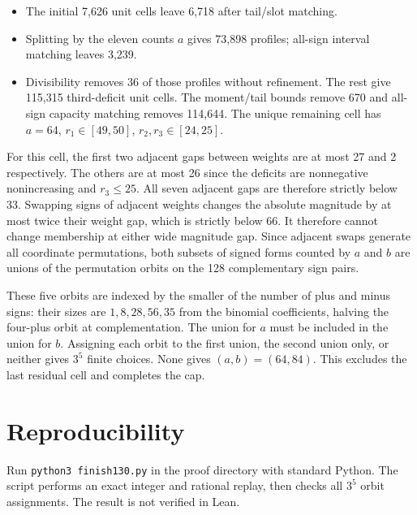 \documentclass[11pt,letterpaper]{article}
\providecommand{\tightlist}{\setlength{\itemsep}{0pt}\setlength{\parskip}{0pt}}
\begin{document}
\begin{itemize}
\tightlist
\item
  The initial 7,626 unit cells leave 6,718 after tail/slot matching.
\item
  Splitting by the eleven counts \(a\) gives 73,898 profiles; all-sign
  interval matching leaves 3,239.
\item
  Divisibility removes 36 of those profiles without refinement. The rest
  give 115,315 third-deficit unit cells. The moment/tail bounds remove
  670 and all-sign capacity matching removes 114,644. The unique
  remaining cell has \(a=64\), \(r_1\in[49,50]\), \(r_2,r_3\in[24,25]\).
\end{itemize}

For this cell, the first two adjacent gaps between weights are at most
27 and 2 respectively. The others are at most 26 since the deficits are
nonnegative nonincreasing and \(r_3\le25\). All seven adjacent gaps are
therefore strictly below 33. Swapping signs of adjacent weights changes
the absolute magnitude by at most twice their weight gap, which is
strictly below 66. It therefore cannot change membership at either wide
magnitude gap. Since adjacent swaps generate all coordinate
permutations, both subsets of signed forms counted by \(a\) and \(b\)
are unions of the permutation orbits on the 128 complementary sign
pairs.

These five orbits are indexed by the smaller of the number of plus and
minus signs: their sizes are \(1,8,28,56,35\) from the binomial
coefficients, halving the four-plus orbit at complementation. The union
for \(a\) must be included in the union for \(b\). Assigning each orbit
to the first union, the second union only, or neither gives \(3^5\)
finite choices. None gives \((a,b)=(64,84)\). This excludes the last
residual cell and completes the cap.


\section{Reproducibility}
Run \texttt{python3 finish130.py} in the proof directory with standard Python.
The script performs an exact integer and rational replay, then checks all
\(3^5\) orbit assignments. The result is not verified in Lean.
\end{document}
